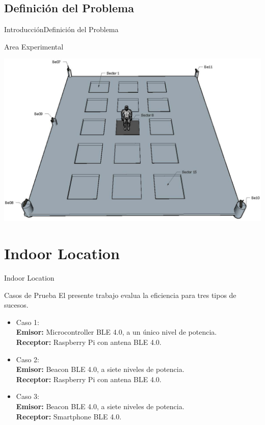 \documentclass[10pt]{beamer}
\begin{document}
\subsection{Definición del Problema}
\begin{frame}{Introducción}{Definición del Problema}
\begin{block}{Area Experimental}
\begin{center}
\includegraphics[scale=0.6]{AAUgraphics/sensors}
\end{center}
\end{block}
\end{frame}
\section{Indoor Location}
\begin{frame}{Indoor Location}{}
\begin{block}{Casos de Prueba}
El presente trabajo evalua la eficiencia para tres tipos de sucesos.\\
\begin{itemize}
	\item Caso 1:\\
	\textbf{Emisor:} Microcontroller BLE 4.0, a un único nivel de potencia.\\
	\textbf{Receptor:} Raspberry Pi con antena BLE 4.0.
	
	\item Caso 2:\\
	\textbf{Emisor:} Beacon BLE 4.0, a siete niveles de potencia.\\
	\textbf{Receptor:} Raspberry Pi con antena BLE 4.0.
	
	\item Caso 3:\\
	\textbf{Emisor:} Beacon BLE 4.0, a siete niveles de potencia.\\
	\textbf{Receptor:} Smartphone BLE 4.0.
\end{itemize}
\end{block}
\end{frame}
\end{document}

